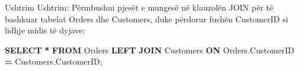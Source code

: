 \documentclass[
  ignorenonframetext,
]{beamer}
\newenvironment{Shaded}{\begin{snugshade}}{\end{snugshade}}
\newcommand{\KeywordTok}[1]{\textcolor[rgb]{0.13,0.29,0.53}{\textbf{#1}}}
\newcommand{\NormalTok}[1]{#1}
\newcommand{\OperatorTok}[1]{\textcolor[rgb]{0.81,0.36,0.00}{\textbf{#1}}}
\begin{document}
\begin{frame}[fragile]{Ushtrim}
\label{ushtrim}
Ushtrim: Përmbushni pjesët e mungesë në klauzolën JOIN për të bashkuar
tabelat Orders dhe Customers, duke përdorur fushën CustomerID si lidhje
midis të dyjave:


\begin{Shaded}
\begin{Highlighting}[]
\KeywordTok{SELECT} \OperatorTok{*}
\KeywordTok{FROM}\NormalTok{ Orders}
\KeywordTok{LEFT} \KeywordTok{JOIN}\NormalTok{ Customers}
\KeywordTok{ON}\NormalTok{ Orders.CustomerID }\OperatorTok{=}\NormalTok{ Customers.CustomerID;}
\end{Highlighting}
\end{Shaded}
\end{frame}
\end{document}
